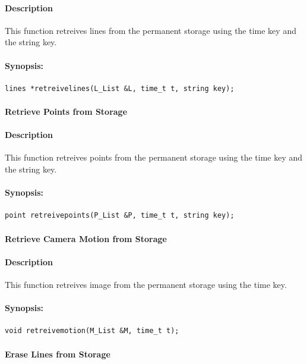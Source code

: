 \paragraph{Description}
This function  retreives lines from the permanent storage using the time key and the string key. 
\paragraph{Synopsis:}
\begin{lstlisting}
lines *retreivelines(L_List &L, time_t t, string key);
\end{lstlisting}


\paragraph{ Retrieve Points from Storage}
\paragraph{Description}
This function  retreives points from the permanent storage using the time key and the string key. 
\paragraph{Synopsis:}
\begin{lstlisting}
point retreivepoints(P_List &P, time_t t, string key);
\end{lstlisting}

\paragraph{ Retrieve Camera Motion from  Storage}
\paragraph{Description}
This function retreives image from the permanent storage using the time key.  
\paragraph{Synopsis:}
\begin{lstlisting}
void retreivemotion(M_List &M, time_t t);
\end{lstlisting}


\paragraph{ Erase Lines from Storage}

